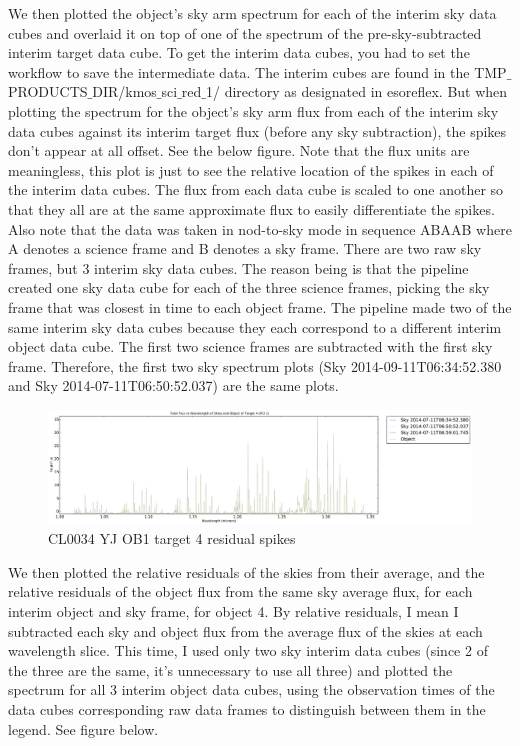 \documentclass[10pt,letterpaper]{article}
\begin{document}
We then plotted the object's sky arm spectrum for each of the interim sky data cubes and overlaid it on top of one of the spectrum of the pre-sky-subtracted interim target data cube. To get the interim data cubes, you had to set the workflow to save the intermediate data. The interim cubes are found in the TMP$\_$PRODUCTS$\_$DIR/kmos$\_$sci$\_$red$\_$1/ directory as designated in esoreflex. But when plotting the spectrum for the object's sky arm flux from each of the interim sky data cubes against its interim target flux (before any sky subtraction), the spikes don't appear at all offset. See the below figure. Note that the flux units are meaningless, this plot is just to see the relative location of the spikes in each of the interim data cubes. The flux from each data cube is scaled to one another so that they all are at the same approximate flux to easily differentiate the spikes. Also note that the data was taken in nod-to-sky mode in sequence ABAAB where A denotes a science frame and B denotes a sky frame. There are two raw sky frames, but 3 interim sky data cubes. The reason being is that the  
pipeline created one sky data cube for each of the three science  
frames, picking the sky frame that was closest in time to each object  
frame. The pipeline made two of the same interim sky data cubes because they each correspond to a different interim object data cube. The first two science frames are subtracted with the first sky frame. Therefore, the first two sky spectrum plots (Sky 2014-09-11T06:34:52.380 and Sky 2014-07-11T06:50:52.037) are the same plots.\\

\begin{figure}[h!]
\caption{CL0034 YJ OB1 target 4 residual spikes}\label{fig:CL0034 YJ OB1 target 4 residual spikes}
\includegraphics[scale=0.4]{figures/flux_of_target_4_IFU_1_relative_residuals_from_interim_data.pdf}
\end{figure}

We then plotted the relative residuals of the skies from their average, and the relative residuals of the object flux from the same sky average flux, for each interim object and sky frame, for object 4. By relative residuals, I mean I subtracted each sky and object flux from the average flux of the skies at each wavelength slice. This time, I used only two sky interim data cubes (since 2 of the three are the same, it's unnecessary to use all three) and plotted the spectrum for all 3 interim object data cubes, using the observation times of the data cubes corresponding raw data frames to distinguish between them in the legend. See figure below.\\
\end{document}
